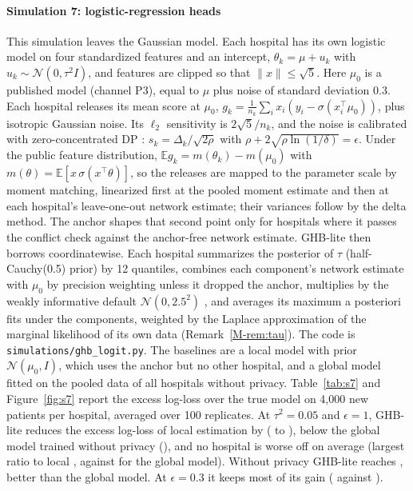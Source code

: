 \documentclass[acmsmall,screen,nonacm]{acmart}
\theoremstyle{acmdefinition}
\begin{document}
\paragraph{Simulation 7: logistic-regression heads} This simulation leaves the Gaussian model. Each hospital has its own logistic model on four standardized features and an intercept, $\theta_k=\mu+u_k$ with $u_k\sim\mathcal{N}(0,\tau^2 I)$, and features are clipped so that $\|x\|\le\sqrt{5}$. Here $\mu_0$ is a published model (channel P3), equal to $\mu$ plus noise of standard deviation 0.3. Each hospital releases its mean score at $\mu_0$, $g_k=\frac{1}{n_k}\sum_i x_i(y_i-\sigma(x_i^\top\mu_0))$, plus isotropic Gaussian noise. Its $\ell_2$ sensitivity is $2\sqrt{5}/n_k$, and the noise is calibrated with zero-concentrated DP \cite{bun2016concentrated}: $s_k=\Delta_k/\sqrt{2\rho}$ with $\rho+2\sqrt{\rho\ln(1/\delta)}=\epsilon$. Under the public feature distribution, $\mathbb{E}g_k=m(\theta_k)-m(\mu_0)$ with $m(\theta)=\mathbb{E}[x\,\sigma(x^\top\theta)]$, so the releases are mapped to the parameter scale by moment matching, linearized first at the pooled moment estimate and then at each hospital's leave-one-out network estimate; their variances follow by the delta method. The anchor shapes that second point only for hospitals where it passes the conflict check against the anchor-free network estimate. GHB-lite then borrows coordinatewise. Each hospital summarizes the posterior of $\tau$ (half-Cauchy(0.5) prior) by 12 quantiles, combines each component's network estimate with $\mu_0$ by precision weighting unless it dropped the anchor, multiplies by the weakly informative default $\mathcal{N}(0,2.5^2)$ \cite{gelman2008weakly}, and averages its maximum a posteriori fits under the components, weighted by the Laplace approximation of the marginal likelihood of its own data (Remark~\ref{M-rem:tau}). The code is \texttt{simulations/ghb\_logit.py}. The baselines are a local model with prior $\mathcal{N}(\mu_0,I)$, which uses the anchor but no other hospital, and a global model fitted on the pooled data of all hospitals without privacy. Table~\ref{tab:s7} and Figure~\ref{fig:s7} report the excess log-loss over the true model on 4,000 new patients per hospital, averaged over 100 replicates. At $\tau^2=0.05$ and $\epsilon=1$, GHB-lite reduces the excess log-loss of local estimation by \SimSevenReduction{} (\SimSevenLocal{} to \SimSevenGHB), below the global model trained without privacy (\SimSevenGlobal), and no hospital is worse off on average (largest ratio to local \SimSevenWorstRatio, against \SimSevenGlobalWorstRatio{} for the global model). Without privacy GHB-lite reaches \SimSevenGHBNoDP, better than the global model. At $\epsilon=0.3$ it keeps most of its gain (\SimSevenGHBTenth{} against \SimSevenLocalTenth).
\end{document}

